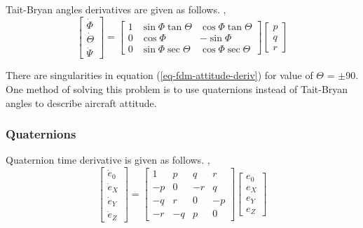 Tait-Bryan angles derivatives are given as follows. \cite{Sibilski2004}, \cite{Allerton2009}
\begin{equation}
  \label{eq-fdm-attitude-deriv}
  \left[
    \begin{matrix}
      \dot \Phi \\
      \dot \Theta \\
      \dot \Psi
    \end{matrix}
  \right]
  =
  \left[
    \begin{matrix}
      1 & \sin \Phi \tan \Theta & \cos \Phi \tan \Theta \\
      0 & \cos \Phi & -\sin \Phi \\
      0 & \sin \Phi \sec \Theta & \cos \Phi \sec \Theta
    \end{matrix}
  \right]
  \left[
    \begin{matrix}
      p \\
      q \\
      r
    \end{matrix}
  \right]
\end{equation}

There are singularities in equation (\ref{eq-fdm-attitude-deriv}) for value of $\Theta$ = $\pm$90\degree . One method of solving this problem is to use quaternions instead of Tait-Bryan angles to describe aircraft attitude.

\subsubsection{Quaternions}

Quaternion time derivative is given as follows. \cite{Sibilski2004}, \cite{StevensLewis1992}
\begin{equation}
  \label{eq-fdm-quaternion-deriv}
  \left[
    \begin{matrix}
      \dot e_0 \\
      \dot e_X \\
      \dot e_Y \\
      \dot e_Z
    \end{matrix}
  \right]
  =
  \left[
    \begin{matrix}
       1 &  p &  q &  r \\
      -p &  0 & -r &  q \\
      -q &  r &  0 & -p \\
      -r & -q &  p &  0
    \end{matrix}
  \right]
  \left[
    \begin{matrix}
      e_0 \\
      e_X \\
      e_Y \\
      e_Z
    \end{matrix}
  \right]
\end{equation}

